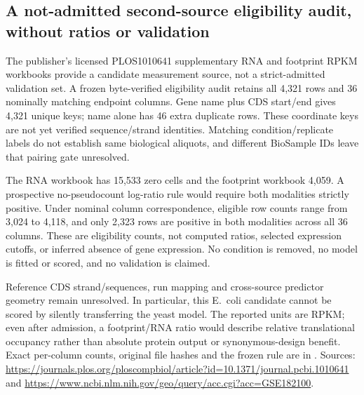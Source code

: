 \subsection{A not-admitted second-source eligibility audit, without ratios or validation}
The publisher's licensed PLOS1010641 supplementary RNA and footprint RPKM workbooks provide a candidate measurement source, not a strict-admitted validation set. A frozen byte-verified eligibility audit retains all 4,321 rows and 36 nominally matching endpoint columns. Gene name plus CDS start/end gives 4,321 unique keys; name alone has 46 extra duplicate rows. These coordinate keys are not yet verified sequence/strand identities. Matching condition/replicate labels do not establish same biological aliquots, and different BioSample IDs leave that pairing gate unresolved.

The RNA workbook has 15,533 zero cells and the footprint workbook 4,059. A prospective no-pseudocount log-ratio rule would require both modalities strictly positive. Under nominal column correspondence, eligible row counts range from 3,024 to 4,118, and only 2,323 rows are positive in both modalities across all 36 columns. These are eligibility counts, not computed ratios, selected expression cutoffs, or inferred absence of gene expression. No condition is removed, no model is fitted or scored, and no validation is claimed.

Reference CDS strand/sequences, run mapping and cross-source predictor geometry remain unresolved. In particular, this E.~coli candidate cannot be scored by silently transferring the yeast model. The reported units are RPKM; even after admission, a footprint/RNA ratio would describe relative translational occupancy rather than absolute protein output or synonymous-design benefit. Exact per-column counts, original file hashes and the frozen rule are in . Sources: \url{https://journals.plos.org/ploscompbiol/article?id=10.1371/journal.pcbi.1010641} and \url{https://www.ncbi.nlm.nih.gov/geo/query/acc.cgi?acc=GSE182100}.
